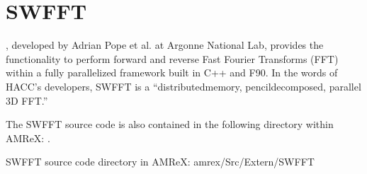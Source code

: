\documentclass[letterpaper,10pt,english]{sphinxmanual}
\begin{document}
\section{SWFFT}
\label{\detokenize{SWFFT:swfft}}\label{\detokenize{SWFFT:swfftdoc}}\label{\detokenize{SWFFT::doc}}
\sphinxAtStartPar
{}, developed by Adrian Pope et al. at Argonne National Lab, provides the functionality to perform forward and reverse Fast Fourier Transforms (FFT) within a fully parallelized framework built in C++ and F90. In the words of HACC’s developers, SWFFT is a “distributed\sphinxhyphen{}memory, pencil\sphinxhyphen{}decomposed, parallel 3D FFT.” \sphinxstepexplicit %
\begin{footnote}[1]\label{\thesphinxscope.1}%
\sphinxAtStartFootnote
{}
%
\end{footnote} The SWFFT source code is also contained in the following directory within AMReX: . \sphinxstepexplicit %
\begin{footnote}[2]\label{\thesphinxscope.2}%
\sphinxAtStartFootnote
SWFFT source code directory in AMReX: amrex/Src/Extern/SWFFT
%
\end{footnote}
\end{document}
